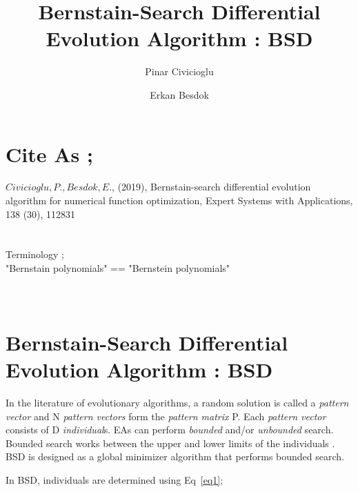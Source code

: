 \documentclass[preprint,10pt,3p]{elsarticle}
\begin{document}
\begin{frontmatter}

\author{Pinar Civicioglu}
\address{Erciyes University, Faculty of Aeronautics and Astronautics, Dept. of Aircraft Electrics and Electronics, Kayseri, Turkey}
\author{Erkan Besdok }
\address{Erciyes University, Faculty of Engineering, Dept. of Geomatics Eng., Kayseri, Turkey}

\title{Bernstain-Search Differential Evolution Algorithm :  BSD }

\end{frontmatter}



\section{Cite As ;}
\label{sec:01}
$Civicioglu, P., Besdok, E.$, (2019), Bernstain-search differential evolution algorithm for numerical function optimization,  Expert Systems with Applications, 138 (30), 112831\\
\\
\\
Terminology ;\\
"Bernstain polynomials" \citep{30} == "Bernstein polynomials" \citep{40}\\
\\
\\

\section{Bernstain-Search Differential Evolution Algorithm : BSD}
\label{sec:02}
\par
In the literature of evolutionary algorithms, a random solution is called a \emph{pattern vector} and N \emph{pattern vectors} form the \emph{pattern matrix} P. Each \emph{pattern vector} consists of D \emph{individual}s. EAs can perform \emph{bounded} and/or \emph{unbounded} search. Bounded search works between the upper and lower limits of the individuals \citep{5,6,7,29}. \textcolor{bluebell}{BSD} is designed as a global minimizer algorithm that performs bounded search.

In \textcolor{bluebell}{BSD}, individuals are determined using Eq~\ref{eq1};
\end{document}
